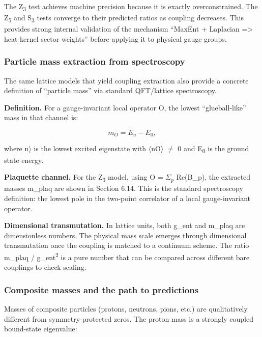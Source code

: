 \documentclass[11pt,a4paper]{article}
\theoremstyle{remark}
\begin{document}
The Z\textsubscript{3} test achieves machine precision because it is exactly
overconstrained. The Z\textsubscript{5} and S\textsubscript{3} tests converge to their
predicted ratios as coupling decreases. This provides strong internal
validation of the mechanism ``MaxEnt + Laplacian =\textgreater{} heat-kernel
sector weights'' before applying it to physical gauge groups.

\subsubsection{Particle mass extraction from spectroscopy}\label{particle-mass-extraction-from-spectroscopy}

The same lattice models that yield coupling extraction also provide a concrete
definition of ``particle mass'' via standard QFT/lattice spectroscopy.

\textbf{Definition.} For a gauge-invariant local operator O, the lowest
``glueball-like'' mass in that channel is:

\[
m_O = E_n - E_0,
\]

where \textbar n\ensuremath{\rangle} is the lowest excited eigenstate with \ensuremath{\langle}n\textbar O\ensuremath{\rangle} \ensuremath{\neq} 0
and E\textsubscript{0} is the ground state energy.

\textbf{Plaquette channel.} For the Z\textsubscript{3} model, using
O = $\Sigma_p$ Re(B\_p), the extracted masses m\_plaq are
shown in Section 6.14. This is the standard spectroscopy definition: the lowest
pole in the two-point correlator of a local gauge-invariant operator.

\textbf{Dimensional transmutation.} In lattice units, both g\_ent and
m\_plaq are dimensionless numbers. The physical mass scale emerges
through dimensional transmutation once the coupling is matched to a continuum
scheme. The ratio m\_plaq / g\_ent\textsuperscript{2} is a pure number
that can be compared across different bare couplings to check scaling.

\subsubsection{Composite masses and the path to predictions}\label{composite-masses-and-the-path-to-predictions}

Masses of composite particles (protons, neutrons, pions, etc.) are
qualitatively different from symmetry-protected zeros. The proton mass is a
strongly coupled bound-state eigenvalue:
\end{document}
